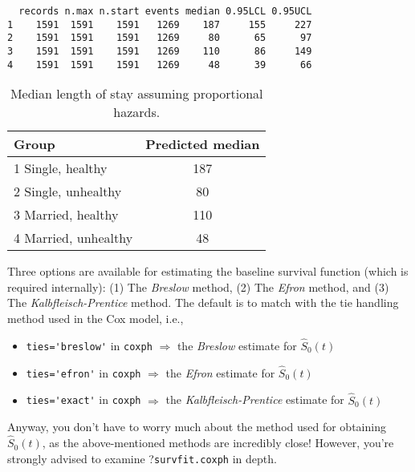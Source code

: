 \begin{enumerate}[(a)]
\begin{enumerate}
\begin{footnotesize}
\begin{verbatim}
  records n.max n.start events median 0.95LCL 0.95UCL
1    1591  1591    1591   1269    187     155     227
2    1591  1591    1591   1269     80      65      97
3    1591  1591    1591   1269    110      86     149
4    1591  1591    1591   1269     48      39      66
\end{verbatim}
\end{footnotesize}
\begin{table}[ht]
\caption{Median length of stay assuming proportional hazards.}
\centering
\begin{tabular}{l c}
\hline
 Group & Predicted median  \\ \hline
 1 Single, healthy & 187 \\
 2 Single, unhealthy & 80 \\
 3 Married, healthy & 110 \\
 4 Married, unhealthy & 48 \\
\hline
\end{tabular}
\label{table:1}
\end{table}
Three options are available for estimating the baseline survival function (which is required internally): (1) The \emph{Breslow} method, (2) The \emph{Efron} method, and (3) The \emph{Kalbfleisch-Prentice} method. The default is to match with the tie handling method used in the Cox model, i.e.,
\begin{itemize}
\item \verb|ties='breslow'| in \verb|coxph| $\Rightarrow$ the \emph{Breslow} estimate for $\hat{S}_{0}(t)$
\item \verb|ties='efron'| in \verb|coxph| $\Rightarrow$ the \emph{Efron} estimate for $\hat{S}_{0}(t)$
\item \verb|ties='exact'| in \verb|coxph| $\Rightarrow$ the \emph{Kalbfleisch-Prentice} estimate for $\hat{S}_{0}(t)$
\end{itemize}
Anyway, you don't have to worry much about the method used for obtaining $\hat{S}_{0}(t)$, as the above-mentioned methods are incredibly close! However, you're strongly advised to examine ?\verb|survfit.coxph| in depth.


\end{enumerate}
\end{enumerate}
